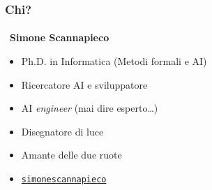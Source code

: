 {
    \begin{frame}[t, fragile] \frametitle{Chi?}
    \framesubtitle{\phantom{\_}}
        \vspace*{-5pt}
        \hspace*{-13pt}
        {\huge
            \color{white} \faUser\ \textbf{Simone Scannapieco}
        }
        {
            \begin{itemize}[leftmargin=10pt,align=right]
                \setlength\itemsep{.7em}
                \item[\color{white}\faBook] \color{white} Ph.D. in Informatica (Metodi formali e AI)
                \item[\color{white}\faBriefcase] \color{white} Ricercatore AI e sviluppatore
                \item[\color{white}\faCodeFork] \color{white} AI \emph{engineer} (mai dire esperto\ldots)
                \item[\color{white}\faCameraRetro] \color{white} Disegnatore di luce
                \item[\color{white}\faBicycle] \color{white} Amante delle due ruote
                \item[\color{white}\faLinkedin] \color{white} \href{https://www.linkedin.com/in/simonescannapieco/}{\texttt{simonescannapieco}}
            \end{itemize}
        }
    \end{frame}
}

